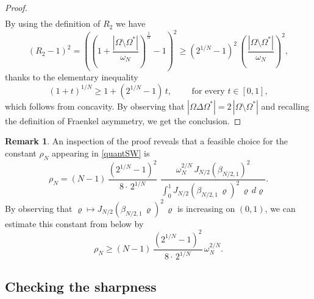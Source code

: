 \documentclass{amsart}
\theoremstyle{definition}
\newtheorem{remark}[lemma]{Remark}
\numberwithin{equation}{section}
\begin{document}
\begin{proof}
\[\begin{split}
\end{split}
\]
By using the definition of $R_2$ we have
\begin{equation}
\label{anellosuper}
\left(R_2-1\right)^2=\left(\left(1+\frac{|\Omega\setminus\Omega^*|}{\omega_N}\right)^\frac{1}{N}-1\right)^2\ge (2^{1/N}-1)^2\,\left(\, \frac{|\Omega\setminus\Omega^*|}{\omega_N}\right)^2,
\end{equation}
thanks to the elementary inequality
\[
(1+t)^{1/N}\ge 1+(2^{1/N}-1)\,t,\qquad \mbox{ for every } t\in[0,1],
\]
which follows from concavity. By observing that $|\Omega\Delta\Omega^*|=2\,|\Omega\setminus \Omega^*|$ and recalling the definition of Fraenkel asymmetry, we get the conclusion.
\end{proof}
\begin{remark}
\label{oss:costanteSW}
An inspection of the proof reveals that a feasible choice for the constant $\rho_N$ appearing in \eqref{quantSW} is
\[
\rho_N=(N-1)\,\frac{(2^{1/N}-1)^2}{8\cdot\,2^{1/N}}\,\, \frac{\omega_N^{2/N}\, J_{N/2}(\beta_{N/2,1})^2}{\displaystyle\int_0^1 J_{N/2}(\beta_{N/2,1}\,\varrho)^2\, \varrho\,d\varrho}.
\]
By observing that $\varrho\mapsto J_{N/2}(\beta_{N/2,1}\,\varrho)^2\, \varrho$ is increasing on $(0,1)$, we can estimate this constant from below by
\[
\rho_N\ge (N-1)\,\frac{(2^{1/N}-1)^2}{8\cdot\,2^{1/N}}\,\omega_N^{2/N}.
\]
\end{remark}

\subsection{Checking the sharpness}
\end{document}

